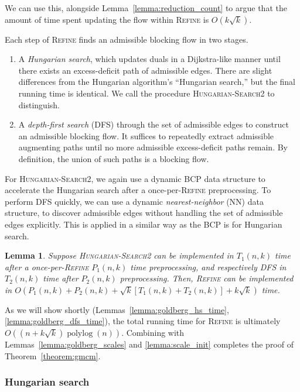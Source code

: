 \documentclass[11pt]{article}
\def\polylog{\mathop{\mathrm{polylog}}}
\theoremstyle{plain}
\newtheorem{lemma}{Lemma}
\begin{document}
We can use this, alongside Lemma~\ref{lemma:reduction_count} to argue that the
amount of time spent updating the flow within \textsc{Refine} is
$O(k\sqrt{k})$.

Each step of \textsc{Refine} finds an admissible blocking flow in two stages.
\begin{enumerate}
\item A \emph{Hungarian search}, which updates duals in a Dijkstra-like
	manner until there exists an excess-deficit path of admissible edges.
	There are slight differences from the Hungarian algorithm's ``Hungarian
	search,'' but the final running time is identical.
	We call the procedure \textsc{Hungarian-Search2} to distinguish.

\item A \emph{depth-first search} (\textsc{DFS}) through the set of admissible
	edges to construct an admissible blocking flow.
	It suffices to repeatedly extract admissible augmenting paths until
	no more admissible excess-deficit paths remain.
	By definition, the union of such paths is a blocking flow.
\end{enumerate}
For \textsc{Hungarian-Search2}, we again use a dynamic BCP data structure to
accelerate the Hungarian search after a once-per-\textsc{Refine} preprocessing.
To perform \textsc{DFS} quickly, we can use a dynamic \emph{nearest-neighbor}
(NN) data structure, to discover admissible edges without handling the set of
admissible edges explicitly.
This is applied in a similar way as the BCP is for Hungarian search.

\begin{lemma}
Suppose \textsc{Hungarian-Search2} can be implemented in $T_1(n, k)$ time after
a once-per-\textsc{Refine} $P_1(n, k)$ time preprocessing, and respectively
\textsc{DFS} in $T_2(n, k)$ time after $P_2(n, k)$ preprocessing.
Then, \textsc{Refine} can be implemented in
$O(P_1(n, k) + P_2(n, k) + \sqrt{k}[T_1(n, k) + T_2(n, k)] + k\sqrt{k})$ time.
\end{lemma}

As we will show shortly (Lemmas~\ref{lemma:goldberg_hs_time},
\ref{lemma:goldberg_dfs_time}), the total running time for \textsc{Refine}
is ultimately $O((n + k\sqrt{k})\polylog(n))$.
Combining with Lemmas~\ref{lemma:goldberg_scales} and \ref{lemma:scale_init}
completes the proof of Theorem~\ref{theorem:gmcm}.

\subsubsection{Hungarian search}
\end{document}
